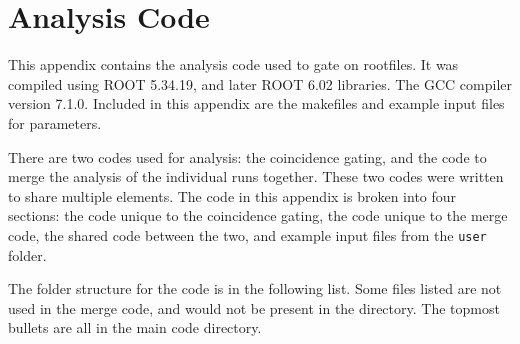 %
%
%
%
%
%
%
%
%
%


%
%

\chapter{Analysis Code}
\label{chap:code}

This appendix contains the analysis code used to gate on rootfiles. It was compiled using ROOT 5.34.19, and later ROOT 6.02 libraries. The GCC compiler version 7.1.0. Included in this appendix are the makefiles and example input files for parameters.

There are two codes used for analysis: the coincidence gating, and the code to merge the analysis of the individual runs together. These two codes were written to share multiple elements. The code in this appendix is broken into four sections: the code unique to the coincidence gating, the code unique to the merge code, the shared code between the two, and example input files from the \texttt{user} folder.

The folder structure for the code is in the following list. Some files listed are not used in the merge code, and would not be present in the directory. The topmost bullets are all in the main code directory. 

